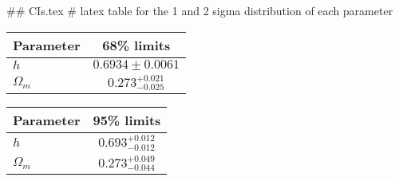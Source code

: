 ## CIs.tex
# latex table for the 1 and 2 sigma distribution of each parameter

\begin{tabular} { l  c}
 Parameter &  68\% limits\\
\hline
{\boldmath$h              $} & $0.6934\pm 0.0061          $\\
{\boldmath$\Omega_m       $} & $0.273^{+0.021}_{-0.025}   $\\
\hline
\end{tabular}

\begin{tabular} { l  c}
 Parameter &  95\% limits\\
\hline
{\boldmath$h              $} & $0.693^{+0.012}_{-0.012}   $\\
{\boldmath$\Omega_m       $} & $0.273^{+0.049}_{-0.044}   $\\
\hline
\end{tabular}
